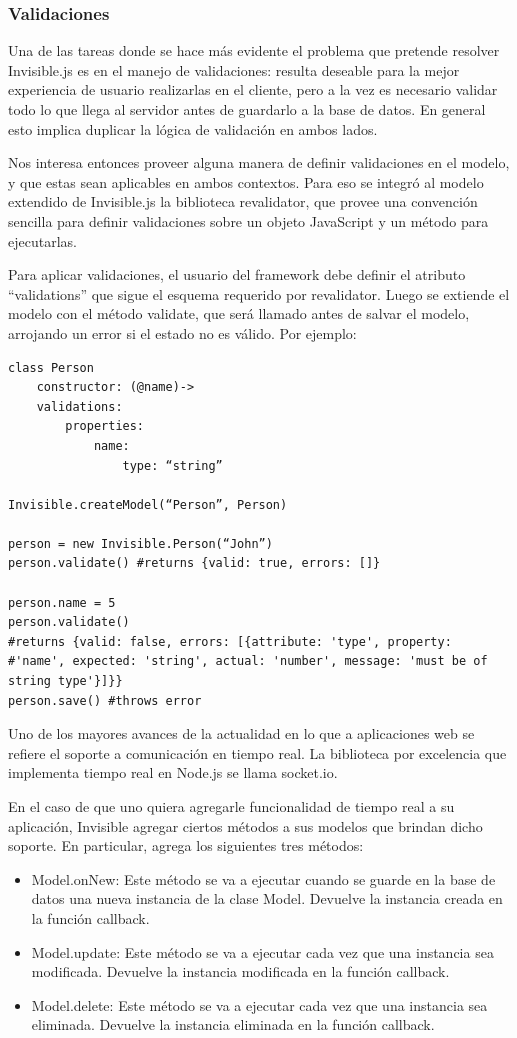 \documentclass[doc,helv,longtable]{article}
\begin{document}
\subsubsection{Validaciones}
Una de las tareas donde se hace más evidente el problema que pretende resolver Invisible.js es en el manejo de validaciones: resulta deseable para la mejor experiencia de usuario realizarlas en el cliente, pero a la vez es necesario validar todo lo que llega al servidor antes de guardarlo a la base de datos. En general esto implica duplicar la lógica de validación en ambos lados.

Nos interesa entonces proveer alguna manera de definir validaciones en el modelo, y que estas sean aplicables en ambos contextos. Para eso se integró al modelo extendido de Invisible.js la biblioteca revalidator\cite{revalidator}, que provee una convención sencilla para definir validaciones sobre un objeto JavaScript y un método para ejecutarlas.

Para aplicar validaciones, el usuario del framework debe definir el atributo “validations” que sigue el esquema requerido por revalidator. Luego se extiende el modelo con el método validate, que será llamado antes de salvar el modelo, arrojando un error si el estado no es válido. Por ejemplo:

\begin{verbatim}
class Person
    constructor: (@name)->
    validations: 
        properties:
            name:
                type: “string”

Invisible.createModel(“Person”, Person)

person = new Invisible.Person(“John”)
person.validate() #returns {valid: true, errors: []}

person.name = 5
person.validate() 
#returns {valid: false, errors: [{attribute: 'type', property: #'name', expected: 'string', actual: 'number', message: 'must be of string type'}]}}
person.save() #throws error
\end{verbatim}

Uno de los mayores avances de la actualidad en lo que a aplicaciones web se refiere el soporte a comunicación en tiempo real. La biblioteca por excelencia que implementa tiempo real en Node.js se llama socket.io. 

En el caso de que uno quiera agregarle funcionalidad de tiempo real a su aplicación, Invisible agregar ciertos métodos a sus modelos que brindan dicho soporte. En particular, agrega los siguientes tres métodos:


\begin{itemize}
\item  Model.onNew: Este método se va a ejecutar cuando se guarde en la base de datos una nueva instancia de la clase Model. Devuelve la instancia creada en la función callback.
\item  Model.update: Este método se va a ejecutar cada vez que una instancia sea modificada. Devuelve la instancia modificada en la función callback.
\item  Model.delete: Este método se va a ejecutar cada vez que una instancia sea eliminada. Devuelve la instancia eliminada en la función callback.

\end{itemize}
\end{document}
